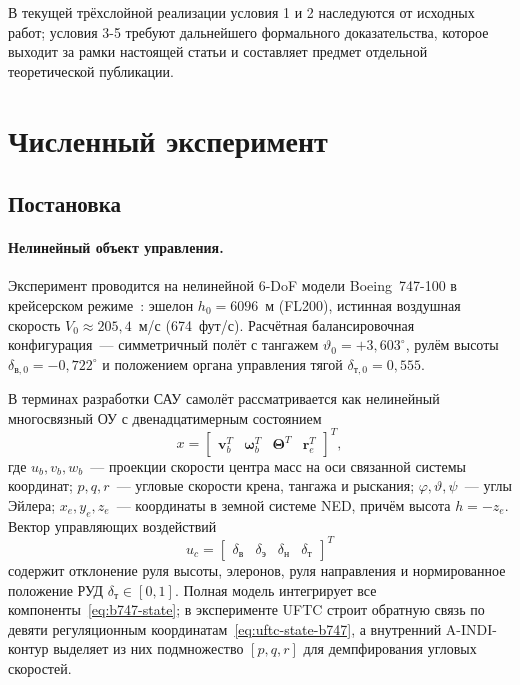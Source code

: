 \documentclass[a4paper,14pt]{extarticle}
\newcommand{\UFTC}{\textsc{UFTC}}
\newcommand{\AINDI}{\textsc{A-INDI}}
\newcommand{\degr}{^{\circ}}
\newcommand{\dv}{\delta_{\text{в}}}
\newcommand{\dn}{\delta_{\text{н}}}
\newcommand{\de}{\delta_{\text{э}}}
\newcommand{\dt}{\delta_{\text{т}}}
\begin{document}
В текущей трёхслойной реализации условия 1 и 2 наследуются от исходных работ; условия 3-5 требуют дальнейшего формального доказательства, которое выходит за рамки настоящей статьи и составляет предмет отдельной теоретической публикации.

\section{Численный эксперимент}
\label{sec:exp}

\subsection{Постановка}

\paragraph{Нелинейный объект управления.} Эксперимент проводится на нелинейной 6-DoF модели Boeing~747-100 в крейсерском режиме~\cite{stevens2003,heffley1972}: эшелон $h_0 = 6096$~м (FL200), истинная воздушная скорость $V_0 \approx 205{,}4$~м/с (674~фут/с). Расчётная балансировочная конфигурация~--- симметричный полёт с тангажем $\vartheta_0 = +3{,}603\degr$, рулём высоты $\delta_{\text{в},0} = -0{,}722\degr$ и положением органа управления тягой $\delta_{\text{т},0} = 0{,}555$.

В терминах разработки САУ самолёт рассматривается как нелинейный многосвязный ОУ с двенадцатимерным состоянием
\begin{equation}
x =
\begin{bmatrix}
\boldsymbol v_b^T & \boldsymbol\omega_b^T & \boldsymbol\Theta^T & \boldsymbol r_e^T
\end{bmatrix}^{T},
\label{eq:b747-state}
\end{equation}
где $u_b,v_b,w_b$~--- проекции скорости центра масс на оси связанной системы координат; $p,q,r$~--- угловые скорости крена, тангажа и рыскания; $\varphi,\vartheta,\psi$~--- углы Эйлера; $x_e,y_e,z_e$~--- координаты в земной системе NED, причём высота $h=-z_e$. Вектор управляющих воздействий
\begin{equation}
u_c = \begin{bmatrix}\dv & \de & \dn & \dt\end{bmatrix}^{T}
\label{eq:b747-control}
\end{equation}
содержит отклонение руля высоты, элеронов, руля направления и нормированное положение РУД $\dt\in[0,1]$. Полная модель интегрирует все компоненты~\eqref{eq:b747-state}; в эксперименте \UFTC{} строит обратную связь по девяти регуляционным координатам~\eqref{eq:uftc-state-b747}, а внутренний \AINDI{}-контур выделяет из них подмножество $[p,q,r]$ для демпфирования угловых скоростей.
\end{document}
